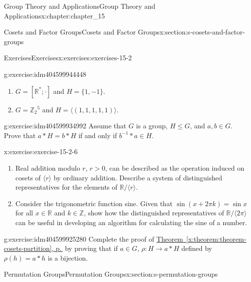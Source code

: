 \documentclass[twoside,10pt,]{book}
\newcommand{\xreffont}{\relax}
\numberwithin{equation}{section}
\begin{document}
\begin{chapterptx}{Group Theory and Applications}{}{Group Theory and Applications}{}{}{x:chapter:chapter_15}
\begin{sectionptx}{Cosets and Factor Groups}{}{Cosets and Factor Groups}{}{}{x:section:s-cosets-and-factor-groups}
\begin{exercises-subsection}{Exercises}{}{Exercises}{}{}{x:exercises:exercises-15-2}
\begin{divisionexercise}{4}{}{}{g:exercise:idm404599944448}
\begin{enumerate}[label=(\alph*)]
\item{}\(G = \left[\mathbb{R}^*; \cdot \right]\)  and  \(H = \{1, -1\}\).%
\item{}\(G =\mathbb{Z}_2{}^5\)  and \(H = \langle (1, 1, 1, 1, 1)\rangle\).%
\end{enumerate}
%
\end{divisionexercise}%
\begin{divisionexercise}{5}{}{}{g:exercise:idm404599934992}%
Assume that \(G\) is a group, \(H \leq  G\), and \(a, b \in  G\).  Prove that \(a*H= b*H\)  if and only if  \(b^{-1}*a \in H\).%
\end{divisionexercise}%
\begin{divisionexercise}{6}{}{}{x:exercise:exercise-15-2-6}%
%
\begin{enumerate}[label=(\alph*)]
\item{}Real addition modulo \(r\),  \(r > 0\), can be described as the operation induced on cosets of \(\langle r\rangle\) by ordinary addition. Describe a system of distinguished representatives for the elements of \(\mathbb{R}/\langle r\rangle\).%
\item{}Consider the trigonometric function sine. Given that \(\sin (x+2\pi k) = \sin  x\) for all \(x\in \mathbb{R}\) and \(k\in \mathbb{Z}\), show how the distinguished representatives of \(\mathbb{R}/\langle 2\pi \rangle\) can be useful in developing an algorithm for calculating the sine of a number.%
\end{enumerate}
%
\end{divisionexercise}%
\begin{divisionexercise}{7}{}{}{g:exercise:idm404599925280}%
Complete the proof of \hyperref[x:theorem:theorem-cosets-partition]{Theorem~{\xreffont\ref{x:theorem:theorem-cosets-partition}}, p.\,\pageref{x:theorem:theorem-cosets-partition}} by proving that if \(a \in  G\), \(\rho:H \to  a*H\) defined by \(\rho(h)= a*h\) is a bijection.%
\end{divisionexercise}%
\end{exercises-subsection}
\end{sectionptx}
%
%
\typeout{************************************************}
\typeout{************************************************}
%
\begin{sectionptx}{Permutation Groups}{}{Permutation Groups}{}{}{x:section:s-permutation-groups}
%
%
%
\typeout{************************************************}
\typeout{************************************************}

\end{sectionptx}
\end{chapterptx}
\end{document}
